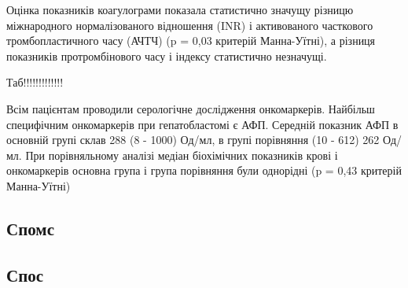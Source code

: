 Оцінка показників коагулограми показала статистично значущу різницю міжнародного нормалізованого відношення (INR) і активованого часткового тромбопластичного часу (АЧТЧ) (p = 0,03 критерій Манна-Уїтні), а різниця показників протромбінового часу і індексу статистично незначущі.


Таб!!!!!!!!!!!!!


Всім пацієнтам проводили серологічне дослідження онкомаркерів. Найбільш специфічним онкомаркерів при гепатобластомі є АФП. Середній показник АФП в основній групі склав 288 (8 - 1000) Од/мл, в групі порівняння (10 - 612) 262 Од/мл. При порівняльному аналізі медіан біохімічних показників крові і онкомаркерів основна група і група порівняння були однорідні (p = 0,43 критерій Манна-Уїтні)

\subsection{Спомс}

\subsection{Спос}

